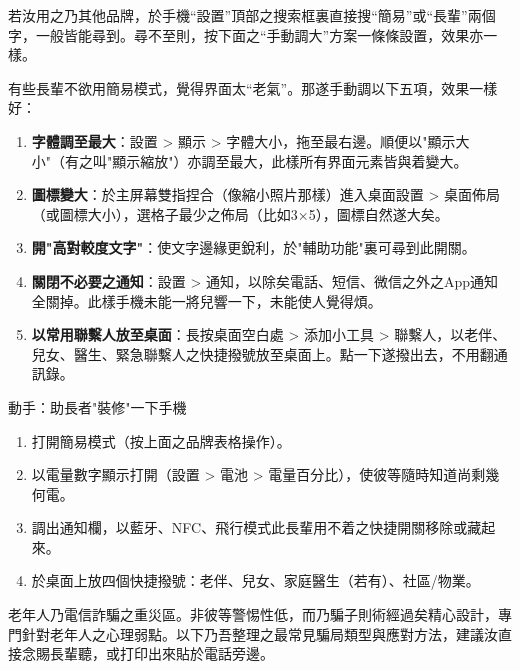 若汝用之乃其他品牌，於手機“設置”頂部之搜索框裏直接搜“簡易”或“長輩”兩個字，一般皆能尋到。尋不至則，按下面之“手動調大”方案一條條設置，效果亦一樣。


有些長輩不欲用簡易模式，覺得界面太“老氣”。那遂手動調以下五項，效果一樣好：

\begin{enumerate}
  \item \textbf{字體調至最大}：設置 > 顯示 > 字體大小，拖至最右邊。順便以"顯示大小"（有之叫"顯示縮放"）亦調至最大，此樣所有界面元素皆與着變大。
  \item \textbf{圖標變大}：於主屏幕雙指捏合（像縮小照片那樣）進入桌面設置 > 桌面佈局（或圖標大小），選格子最少之佈局（比如3×5），圖標自然遂大矣。
  \item \textbf{開"高對較度文字"}：使文字邊緣更銳利，於"輔助功能"裏可尋到此開關。
  \item \textbf{關閉不必要之通知}：設置 > 通知，以除矣電話、短信、微信之外之App通知全關掉。此樣手機未能一將兒響一下，未能使人覺得煩。
  \item \textbf{以常用聯繫人放至桌面}：長按桌面空白處 > 添加小工具 > 聯繫人，以老伴、兒女、醫生、緊急聯繫人之快捷撥號放至桌面上。點一下遂撥出去，不用翻通訊錄。
\end{enumerate}

\begin{tcbpractice}{動手：助長者"裝修"一下手機}
\begin{enumerate}
  \item 打開簡易模式（按上面之品牌表格操作）。
  \item 以電量數字顯示打開（設置 > 電池 > 電量百分比），使彼等隨時知道尚剩幾何電。
  \item 調出通知欄，以藍牙、NFC、飛行模式此長輩用不着之快捷開關移除或藏起來。
  \item 於桌面上放四個快捷撥號：老伴、兒女、家庭醫生（若有）、社區/物業。
\end{enumerate}

\end{tcbpractice}


老年人乃電信詐騙之重災區。非彼等警惕性低，而乃騙子則術經過矣精心設計，專門針對老年人之心理弱點。以下乃吾整理之最常見騙局類型與應對方法，建議汝直接念賜長輩聽，或打印出來貼於電話旁邊。


